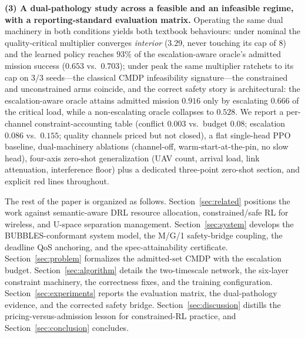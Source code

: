 \textbf{(3) A dual-pathology study across a feasible and an infeasible
regime, with a reporting-standard evaluation matrix.} Operating the same
dual machinery in both conditions yields both textbook behaviours: under
nominal the quality-critical multiplier converges \emph{interior} ($3.29$,
never touching its cap of $8$) and the learned policy reaches $93\%$ of
the escalation-aware oracle's admitted mission success ($0.653$ vs.\
$0.703$); under peak the same multiplier ratchets to its cap on $3/3$
seeds---the classical CMDP infeasibility signature---the constrained and
unconstrained arms coincide, and the correct safety story is
architectural: the escalation-aware oracle attains admitted mission
$0.916$ only by escalating $0.666$ of the critical load, while a
non-escalating oracle collapses to $0.528$. We report a per-channel
constraint-accounting table (conflict $0.003$ vs.\ budget $0.08$;
escalation $0.086$ vs.\ $0.155$; quality channels priced but not closed),
a flat single-head PPO baseline, dual-machinery ablations (channel-off,
warm-start-at-the-pin, no slow head), four-axis zero-shot generalization
(UAV count, arrival load, link attenuation, interference floor) plus a
dedicated three-point zero-shot section, and explicit red lines
throughout.

The rest of the paper is organized as follows. Section~\ref{sec:related}
positions the work against semantic-aware DRL resource allocation,
constrained/safe RL for wireless, and U-space separation management.
Section~\ref{sec:system} develops the BUBBLES-conformant system model, the
M/G/1 safety-bridge coupling, the deadline QoS anchoring, and the
spec-attainability certificate. Section~\ref{sec:problem} formalizes the
admitted-set CMDP with the escalation budget. Section~\ref{sec:algorithm}
details the two-timescale network, the six-layer constraint machinery, the
correctness fixes, and the training configuration.
Section~\ref{sec:experiments} reports the evaluation matrix, the
dual-pathology evidence, and the corrected safety bridge.
Section~\ref{sec:discussion} distills the pricing-versus-admission lesson
for constrained-RL practice, and Section~\ref{sec:conclusion} concludes.
